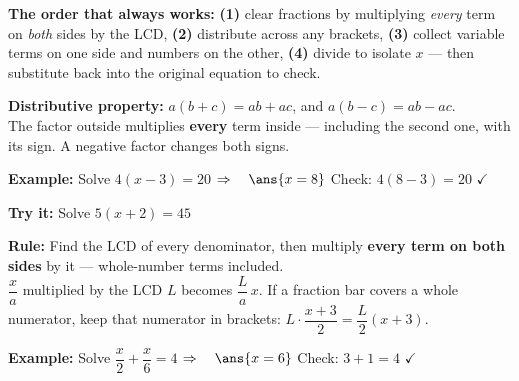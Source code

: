 \documentclass[12pt]{article}
\begin{document}

\noindent\small\textbf{The order that always works:} \textbf{(1)} clear fractions by multiplying
\emph{every} term on \emph{both} sides by the LCD, \textbf{(2)} distribute across any brackets,
\textbf{(3)} collect variable terms on one side and numbers on the other, \textbf{(4)} divide to
isolate $x$ --- then substitute back into the original equation to check.\normalsize


\begin{formulabox}
\textbf{Distributive property:} $a(b + c) = ab + ac$, and $a(b - c) = ab - ac$.\\[3pt]
The factor outside multiplies \textbf{every} term inside --- including the second one, with its
sign. A negative factor changes both signs.
\end{formulabox}

\begin{examplebox}
\textbf{Example:} \quad Solve $4(x - 3) = 20$
$\Rightarrow\quad \ans{x = 8}$ \quad Check: $4(8 - 3) = 20$ $\checkmark$
\end{examplebox}

\begin{tryitbox}
\textbf{Try it:} \quad Solve $5(x + 2) = 45$\\[2pt]
\end{tryitbox}


\begin{formulabox}
\textbf{Rule:} Find the LCD of every denominator, then multiply \textbf{every term on both sides}
by it --- whole-number terms included.\\[3pt]
$\dfrac{x}{a}$ multiplied by the LCD $L$ becomes $\dfrac{L}{a}\,x$. If a fraction bar covers a
whole numerator, keep that numerator in brackets: $L \cdot \dfrac{x + 3}{2} = \dfrac{L}{2}(x + 3)$.
\end{formulabox}

\begin{examplebox}
\textbf{Example:} \quad Solve $\dfrac{x}{2} + \dfrac{x}{6} = 4$
$\Rightarrow\quad \ans{x = 6}$ \quad Check: $3 + 1 = 4$ $\checkmark$
\end{examplebox}
\end{document}
